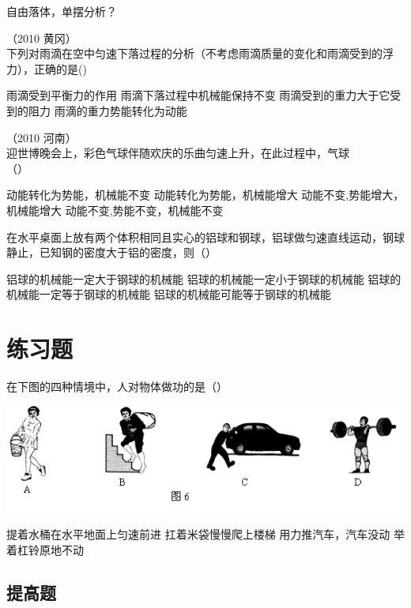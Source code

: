 \documentclass[12pt]{exam}
\begin{document}
自由落体，单摆分析？

\begin{questions}
\setcounter{question}{0}
\question
（2010 黄冈）\\
下列对雨滴在空中匀速下落过程的分析（不考虑雨滴质量的变化和雨滴受到的浮力），正确的是(\answerline*[A] )
\begin{choices}
\choice 雨滴受到平衡力的作用
\choice 雨滴下落过程中机械能保持不变
\choice 雨滴受到的重力大于它受到的阻力
\choice 雨滴的重力势能转化为动能
\end{choices}

\question
（2010 河南）\\
迎世博晚会上，彩色气球伴随欢庆的乐曲匀速上升，在此过程中，气球\\（\answerline*[C]）
\begin{choices}
\choice 动能转化为势能，机械能不变 
\choice 动能转化为势能，机械能增大
\choice 动能不变,势能增大，机械能增大
\choice 动能不变,势能不变，机械能不变
\end{choices}

\question
在水平桌面上放有两个体积相同且实心的铝球和钢球，铝球做匀速直线运动，钢球静止，已知钢的密度大于铝的密度，则（\answerline*[D]）

\begin{choices}
\choice 铝球的机械能一定大于钢球的机械能 
\choice 铝球的机械能一定小于钢球的机械能
\choice 铝球的机械能一定等于钢球的机械能
\choice 铝球的机械能可能等于钢球的机械能
\end{choices}
\end{questions}



\section{练习题}
\begin{questions}
\question
在下图的四种情境中，人对物体做功的是（\answerline*[B]）

\includegraphics[scale=1]{figures/图片1.png} 
\begin{choices}
\choice 提着水桶在水平地面上匀速前进
\choice 扛着米袋慢慢爬上楼梯 
\choice 用力推汽车，汽车没动
\choice 举着杠铃原地不动
\end{choices}

\question



\end{questions}












\begin{advanceexercises}
\section{提高题}



\end{advanceexercises}

\end{document}

